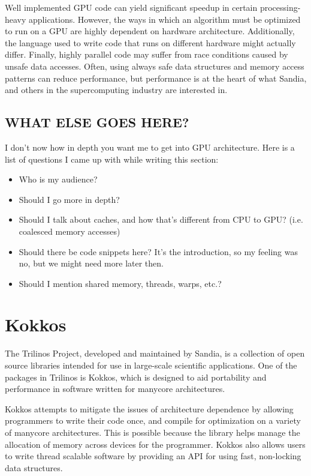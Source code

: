 Well implemented GPU code can yield significant speedup in certain
processing-heavy applications.  However, the ways in which an algorithm must be
optimized to run on a GPU are highly dependent on hardware architecture. Additionally, the language
used to write code that runs on different hardware might actually differ.  Finally, 
highly parallel code may suffer from race conditions caused by unsafe data accesses.
Often, using always safe data structures and memory access patterns can reduce performance, 
but performance is at the heart of what Sandia, and others in the supercomputing industry
are %
interested in.

\subsection{WHAT ELSE GOES HERE?}
I don't now how in depth you want me to get into GPU architecture. Here is a list of questions I came up 
with while writing this section:
\begin{itemize}
	\item Who is my audience?
	\item Should I go more in depth?
	\item Should I talk about caches, and how that's different from CPU to GPU? (i.e. coalesced memory accesses)
	\item Should there be code snippets here? It's the introduction, so my feeling was no, but we might need more later then.
	\item Should I mention shared memory, threads, warps, etc.?
\end{itemize}


\section{Kokkos}

 The Trilinos Project, developed and maintained by
Sandia, is a collection of open source libraries intended for use in large-scale
scientific applications.
One of the packages in Trilinos is Kokkos, which is designed to aid portability
and performance in software written for manycore architectures.  

Kokkos attempts to mitigate the issues of architecture dependence 
by allowing programmers to write their
code once, and compile for optimization on a variety of manycore architectures.
This is possible because the library helps manage the allocation of memory across devices for the
programmer. Kokkos
also allows users to write thread scalable software by providing an API for
using fast, non-locking data structures.

